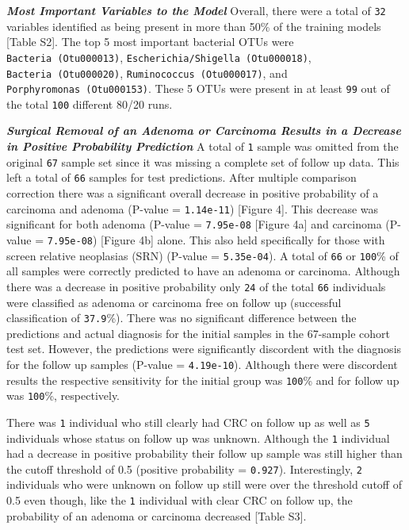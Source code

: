 \documentclass[12pt,]{article}
\begin{document}
\textbf{\emph{Most Important Variables to the Model}} Overall, there
were a total of \texttt{32} variables identified as being present in
more than 50\% of the training models {[}Table S2{]}. The top 5 most
important bacterial OTUs were \texttt{Bacteria\ (Otu000013)},
\texttt{Escherichia/Shigella\ (Otu000018)},
\texttt{Bacteria\ (Otu000020)}, \texttt{Ruminococcus\ (Otu000017)}, and
\texttt{Porphyromonas\ (Otu000153)}. These 5 OTUs were present in at
least \texttt{99} out of the total \texttt{100} different 80/20 runs.

\textbf{\emph{Surgical Removal of an Adenoma or Carcinoma Results in a
Decrease in Positive Probability Prediction}} A total of \texttt{1}
sample was omitted from the original \texttt{67} sample set since it was
missing a complete set of follow up data. This left a total of
\texttt{66} samples for test predictions. After multiple comparison
correction there was a significant overall decrease in positive
probability of a carcinoma and adenoma (P-value = \texttt{1.14e-11})
{[}Figure 4{]}. This decrease was significant for both adenoma (P-value
= \texttt{7.95e-08} {[}Figure 4a{]} and carcinoma (P-value =
\texttt{7.95e-08}) {[}Figure 4b{]} alone. This also held specifically
for those with screen relative neoplasias (SRN) (P-value =
\texttt{5.35e-04}). A total of \texttt{66} or \texttt{100}\% of all
samples were correctly predicted to have an adenoma or carcinoma.
Although there was a decrease in positive probability only \texttt{24}
of the total \texttt{66} individuals were classified as adenoma or
carcinoma free on follow up (successful classification of
\texttt{37.9}\%). There was no significant difference between the
predictions and actual diagnosis for the initial samples in the
67-sample cohort test set. However, the predictions were significantly
discordent with the diagnosis for the follow up samples (P-value =
\texttt{4.19e-10}). Although there were discordent results the
respective sensitivity for the initial group was \texttt{100}\% and for
follow up was \texttt{100}\%, respectively.

There was \texttt{1} individual who still clearly had CRC on follow up
as well as \texttt{5} individuals whose status on follow up was unknown.
Although the \texttt{1} individual had a decrease in positive
probability their follow up sample was still higher than the cutoff
threshold of 0.5 (positive probability = \texttt{0.927}). Interestingly,
\texttt{2} individuals who were unknown on follow up still were over the
threshold cutoff of 0.5 even though, like the \texttt{1} individual with
clear CRC on follow up, the probability of an adenoma or carcinoma
decreased {[}Table S3{]}.
\end{document}
